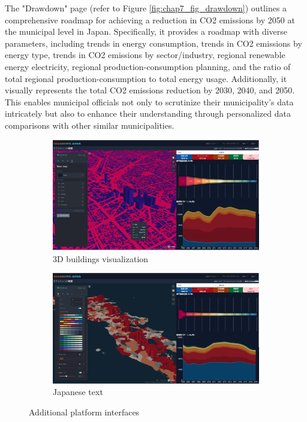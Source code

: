 The "Drawdown" page (refer to Figure \ref{fig:chap7_fig_drawdown}) outlines a comprehensive roadmap for achieving a reduction in CO2 emissions by 2050 at the municipal level in Japan. Specifically, it provides a roadmap with diverse parameters, including trends in energy consumption, trends in CO2 emissions by energy type, trends in CO2 emissions by sector/industry, regional renewable energy electricity, regional production-consumption planning, and the ratio of total regional production-consumption to total energy usage. Additionally, it visually represents the total CO2 emissions reduction by 2030, 2040, and 2050. This enables municipal officials not only to scrutinize their municipality's data intricately but also to enhance their understanding through personalized data comparisons with other similar municipalities. \par

\begin{figure}[tbh!]
  \centering
  \begin{subfigure}{.5\textwidth}
      \centering
      \includegraphics[width=.9\textwidth]{figs/chap7/3d_bldg.png}
      \caption{3D buildings visualization}
  \end{subfigure}%
  \begin{subfigure}{.5\textwidth}
      \centering
      \includegraphics[width=.9\textwidth]{figs/chap7/3d_ja.png}
      \caption{Japanese text}
  \end{subfigure}
  \caption{Additional platform interfaces}
  \label{fig:chap7_fig_other_interface}
\end{figure}

